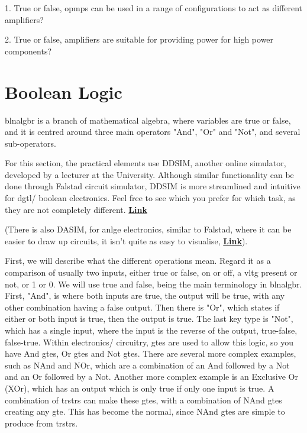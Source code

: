 \documentclass[a4paper,11pt]{report}
\newcommand{\Quiz}[1] %
{
\par\noindent %
\phantomsection %
\todo[inline, color=blue!30]{\textbf{#1}} %
\vspace{1em} %
}
\let\oldhref\href %
\renewcommand{\href}[2]{\oldhref{#1}{\bfseries#2}}
\begin{document}
\Quiz{Quiz}

1. True or false, \gls{opmp}s can be used in a range of configurations to act as different amplifiers?

2. True or false, amplifiers are suitable for providing power for high power components?

\pagebreak

\section{Boolean Logic}

\gls{blnalgbr} is a branch of mathematical algebra, where variables are true or false, and it is centred around three main operators "And", "Or" and "Not", and several sub-operators.

For this section, the practical elements use DDSIM, another online simulator, developed by a lecturer at the University. Although similar functionality can be done through Falstad circuit simulator, DDSIM is more streamlined and intuitive for \gls{dgtl}/ boolean electronics. Feel free to see which you prefer for which task, as they are not completely different.
\href{https://www-users.york.ac.uk/~dajp1/Temp/ddsim.html}{Link}

(There is also DASIM, for \gls{anlge} electronics, similar to Falstad, where it can be easier to draw up circuits, it isn't quite as easy to visualise, \href{https://www-users.york.ac.uk/~dajp1/Temp/dasim.html}{Link}).

First, we will describe what the different operations mean. Regard it as a comparison of usually two inputs, either true or false, on or off, a \gls{vltg} present or not, or 1 or 0. We will use true and false, being the main terminology in \gls{blnalgbr}. First, "And", is where both inputs are true, the output will be true, with any other combination having a false output. Then there is "Or", which states if either or both input is true, then the output is true. The last key type is "Not", which has a single input, where the input is the reverse of the output, true-false, false-true. Within electronics/ circuitry, \gls{gte}s are used to allow this logic, so you have And \gls{gte}s, Or \gls{gte}s and Not \gls{gte}s. There are several more complex examples, such as NAnd and NOr, which are a combination of an And followed by a Not and an Or followed by a Not. Another more complex example is an Exclusive Or (XOr), which has an output which is only true if only one input is true. A combination of \gls{trstr}s can make these \gls{gte}s, with a combination of NAnd \gls{gte}s creating any \gls{gte}. This has become the normal, since NAnd \gls{gte}s are simple to produce from \gls{trstr}s.
\end{document}
